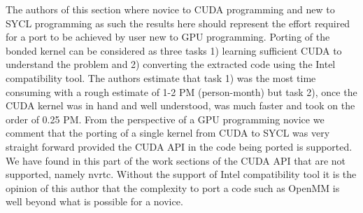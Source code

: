 The authors of this section where novice to CUDA programming and new to SYCL programming as such the results here should represent the effort required for a port to be achieved by user new to GPU programming. Porting of the bonded kernel can be considered as three tasks 1) learning sufficient CUDA to understand the problem and 2) converting the extracted code using the Intel compatibility tool. The authors estimate that task 1) was the most time consuming with a rough estimate of 1-2 PM (person-month) but task 2), once the CUDA kernel was in hand and well understood, was much faster and took on the order of 0.25 PM. From the perspective of a GPU programming novice we comment that the porting of a single kernel from CUDA to SYCL was very straight forward provided the CUDA API in the code being ported is supported. We have found in this part of the work sections of the CUDA API that are not supported, namely nvrtc. Without the support of Intel compatibility tool it is the opinion of this author that the complexity to port a code such as OpenMM is well beyond what is possible for a novice.